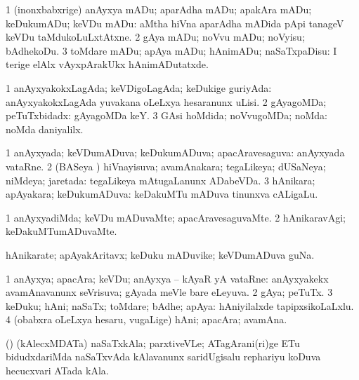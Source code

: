 \bentry
{}
\gl{\sakirx}
\bmng
\bnum
\num{1} (inonxbabxrige) anAyxya mADu; aparAdha mADu; apakAra mADu; keDukumADu; keVDu mADu:  aMtha hiVna aparAdha mADida pApi tanageV keVDu taMdukoLuLxtAtxne. 
\num{2} gAya mADu; noVvu mADu; noVyisu; bAdhekoDu. 
\num{3} toMdare mADu; apAya mADu; hAnimADu; naSaTxpaDisu:  I terige elAlx vAyxpArakUkx hAnimADutatxde. 
\enum
\emng
\eentry

\bentry
{}
\gl{\gu}
\bmng
\bnum
\num{1} anAyxyakokxLagAda; keVDigoLagAda; keDukige guriyAda:  anAyxyakokxLagAda yuvakana oLeLxya hesaranunx uLisi. 
\num{2} gAyagoMDa; peTuTxbidadx:  gAyagoMDa keY. 
\num{3} GAsi hoMdida; noVvugoMDa; noMda:  noMda daniyalilx. 
\enum
\emng
\eentry

\bentry
{}
\gl{\gu}
\bmng
\bnum
\num{1} anAyxyada; keVDumADuva; keDukumADuva; apacAravesaguva:  anAyxyada vataRne. 
\num{2} (BASeya \vi) hiVnayisuva; avamAnakara; tegaLikeya; dUSaNeya; niMdeya; jaretada:  tegaLikeya mAtugaLanunx ADabeVDa. 
\num{3} hAnikara; apAyakara; keDukumADuva:  keDakuMTu mADuva tinunxva cALigaLu. 
\enum
\emng
\eentry

\bentry
{}
\gl{\kirxvi}
\bmng
\bnum
\num{1} anAyxyadiMda; keVDu mADuvaMte; apacAravesaguvaMte. 
\num{2} hAnikaravAgi; keDakuMTumADuvaMte. 
\enum
\emng
\eentry

\bentry
{}
\gl{\nA}
\bmng
hAnikarate; apAyakAritavx; keDuku mADuvike; keVDumADuva guNa. 
\emng
\eentry

\bentry
{}
\gl{\nA}
\bmng
\bnum
\num{1} anAyxya; apacAra; keVDu; anAyxya -- kAyaR yA vataRne:  anAyxyakekx avamAnavanunx seVrisuva; gAyada meVle bare eLeyuva. 
\num{2} gAya; peTuTx. 
\num{3} keDuku; hAni; naSaTx; toMdare; bAdhe; apAya:  hAniyilalxde tapipxsikoLaLxlu. 
\num{4} (obabxra oLeLxya hesaru, \mo vugaLige) hAni; apacAra; avamAna. 
\enum
\emng
\eentry

\bentry
{}
\gl{\nA}
\bmng
(\birx) (kAlecxMDATa) naSaTxkAla; parxtiveVLe; ATagArani(ri)ge ETu bidudxdariMda naSaTxvAda kAlavanunx saridUgisalu rephariyu koDuva hecucxvari ATada kAla. 
\emng
\eentry

